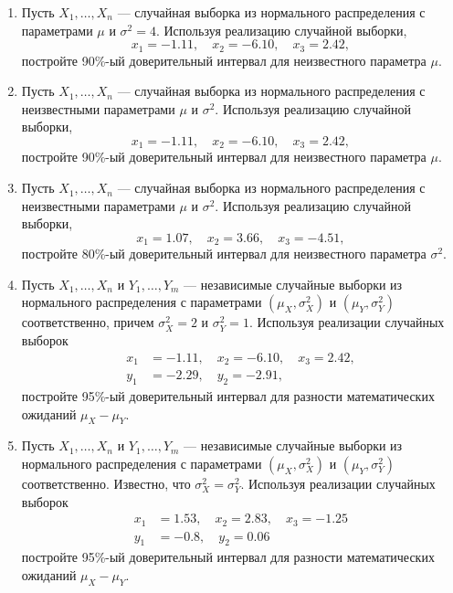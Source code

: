 \begin{enumerate}

\item Пусть $X_{1}, \ldots, X_{n}$  — случайная выборка из нормального
распределения с параметрами $\mu$ и ${\sigma}^2 = 4$.
Используя реализацию случайной выборки,
\[
x_{1} = -1.11, \quad x_{2} = -6.10, \quad x_{3} =  2.42,
\]
постройте 90\%-ый доверительный интервал для неизвестного параметра $\mu$.

\item Пусть $X_{1}, \ldots, X_{n}$ — случайная выборка
из нормального распределения с неизвестными параметрами $\mu$ и ${\sigma}^2$.
Используя реализацию случайной выборки,
\[
x_{1} = -1.11, \quad x_{2} = -6.10, \quad x_{3} = 2.42,
\]
постройте 90\%-ый доверительный интервал для неизвестного параметра $\mu$.

\item Пусть $X_{1}, \ldots, X_{n}$ — случайная выборка из нормального распределения
с неизвестными параметрами $\mu$ и ${\sigma}^2$.
Используя реализацию случайной выборки,
\[
x_{1} = 1.07, \quad x_{2} = 3.66, \quad x_{3} = -4.51,
\]
постройте 80\%-ый доверительный интервал для неизвестного параметра ${\sigma}^2$.

\item Пусть $X_{1}, \ldots, X_{n}$ и $Y_{1}, \ldots, Y_{m}$ —
независимые случайные выборки из нормального распределения с параметрами
$(\mu_{X},{\sigma^2_{X}})$ и $(\mu_{Y},{\sigma^2_{Y}})$ соответственно,
причем $\sigma^2_{X} = 2$ и $\sigma^2_{Y} = 1$.
Используя реализации случайных выборок
\begin{align*}
x_{1} &= -1.11, \quad x_{2} = -6.10, \quad x_{3} = 2.42, \\
y_{1} &= -2.29, \quad y_{2} = -2.91,
\end{align*}
постройте 95\%-ый доверительный интервал для разности математических ожиданий
$\mu_{X} - \mu_{Y}$.

\item Пусть $X_{1}, \ldots, X_{n}$ и $Y_{1}, \ldots, Y_{m}$ —
независимые случайные выборки из нормального распределения с параметрами
$(\mu_{X},{\sigma^2_{X}})$ и $(\mu_{Y},{\sigma^2_{Y}})$ соответственно.
Известно, что $\sigma^2_{X} = \sigma^2_{Y}$.
Используя реализации случайных выборок
\begin{align*}
x_{1} &= 1.53, \quad x_{2} = 2.83, \quad x_{3} = -1.25 \\
y_{1} &= -0.8, \quad y_{2} = 0.06
\end{align*}
постройте 95\%-ый доверительный интервал для разности математических ожиданий
$\mu_{X} - \mu_{Y}$.


\end{enumerate}
